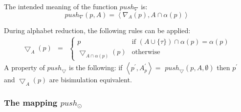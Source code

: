 \documentclass{article}
\begin{document}
The intended meaning of the function $push_{\nabla }$ is:%
\[
push_{\nabla }(p,A)=\left\langle \nabla _{A}(p),A\cap \alpha
(p)\right\rangle 
\]

During alphabet reduction, the following rules can be applied:%
\[
\begin{array}{lll}
\bigtriangledown _{A}(p) & = & \left\{ 
\begin{array}{ll}
p & \text{if }(A\cup \{\tau \})\cap \alpha (p)=\alpha (p) \\ 
\bigtriangledown _{A\cap \alpha (p)}(p) & \text{otherwise}%
\end{array}%
\right. 
\end{array}%
\]%
A property of $push_{\bigtriangledown }$ is the following: if $\left\langle
p^{\prime },A_{p}^{\prime }\right\rangle =$ $push_{\bigtriangledown
}(p,A,\emptyset )$ then $p^{\prime }$ and $\bigtriangledown _{A}(p)$ are
bisimulation equivalent.\newpage 

\subsubsection{The mapping $push_{\odot }$}
\end{document}
